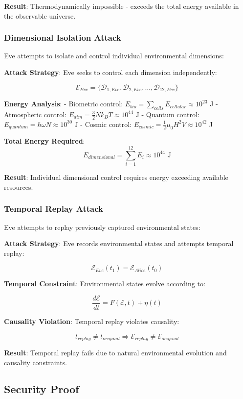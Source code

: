 \documentclass[12pt]{article}
\begin{document}
\textbf{Result}: Thermodynamically impossible - exceeds the total energy available in the observable universe.

\subsubsection{Dimensional Isolation Attack}

Eve attempts to isolate and control individual environmental dimensions:

\textbf{Attack Strategy}: Eve seeks to control each dimension independently:

$$\mathcal{E}_{Eve} = \{\mathcal{D}_{1,Eve}, \mathcal{D}_{2,Eve}, \ldots, \mathcal{D}_{12,Eve}\}$$

\textbf{Energy Analysis}:
- Biometric control: $E_{bio} = \sum_{cells} E_{cellular} \approx 10^{23}$ J
- Atmospheric control: $E_{atm} = \frac{3}{2}Nk_B T \approx 10^{44}$ J  
- Quantum control: $E_{quantum} = \hbar \omega N \approx 10^{30}$ J
- Cosmic control: $E_{cosmic} = \frac{1}{2}\mu_0 H^2 V \approx 10^{42}$ J

\textbf{Total Energy Required}: 
$$E_{dimensional} = \sum_{i=1}^{12} E_i \approx 10^{44} \text{ J}$$

\textbf{Result}: Individual dimensional control requires energy exceeding available resources.

\subsubsection{Temporal Replay Attack}

Eve attempts to replay previously captured environmental states:

\textbf{Attack Strategy}: Eve records environmental states and attempts temporal replay:

$$\mathcal{E}_{Eve}(t_1) = \mathcal{E}_{Alice}(t_0)$$

\textbf{Temporal Constraint}: Environmental states evolve according to:

$$\frac{d\mathcal{E}}{dt} = F(\mathcal{E}, t) + \eta(t)$$

\textbf{Causality Violation}: Temporal replay violates causality:

$$t_{replay} \neq t_{original} \Rightarrow \mathcal{E}_{replay} \neq \mathcal{E}_{original}$$

\textbf{Result}: Temporal replay fails due to natural environmental evolution and causality constraints.

\subsection{Security Proof}
\end{document}
